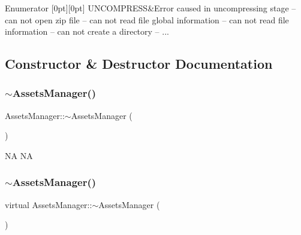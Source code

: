 \begin{DoxyEnumFields}{Enumerator}
[0pt][0pt]{}\mbox{\label{classAssetsManager_a5e348d12e70204e183b449f8dec2577da125ee7a84dca120371a1d7757d9d4a44}} 
U\+N\+C\+O\+M\+P\+R\+E\+SS&Error caused in uncompressing stage -- can not open zip file -- can not read file global information -- can not read file information -- can not create a directory -- ... \\
\hline

\end{DoxyEnumFields}


\subsection{Constructor \& Destructor Documentation}
\mbox{\label{classAssetsManager_aa3edb24b073adecfb1281d9caa5896d2}} 
\subsubsection{\texorpdfstring{$\sim$\+Assets\+Manager()}{~AssetsManager()}\hspace{0.1cm}{\footnotesize\ttfamily [1/2]}}
{\footnotesize\ttfamily Assets\+Manager\+::$\sim$\+Assets\+Manager (\begin{DoxyParamCaption}{ }\end{DoxyParamCaption})\hspace{0.3cm}{\ttfamily [virtual]}}

NA  NA \mbox{\label{classAssetsManager_a059cca91ff2ea8871011da0225c614bb}} 
\subsubsection{\texorpdfstring{$\sim$\+Assets\+Manager()}{~AssetsManager()}\hspace{0.1cm}{\footnotesize\ttfamily [2/2]}}
{\footnotesize\ttfamily virtual Assets\+Manager\+::$\sim$\+Assets\+Manager (\begin{DoxyParamCaption}{ }\end{DoxyParamCaption})\hspace{0.3cm}{\ttfamily [virtual]}}

